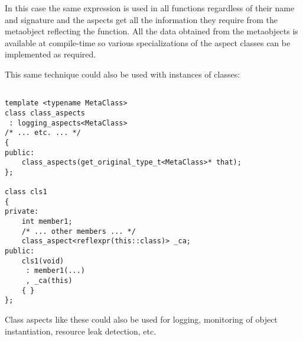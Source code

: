 In this case the same expression is used in all functions
regardless of their name and signature and the aspects get all the information
they require from the metaobject reflecting the function. All the data
obtained from the metaobjects is available at compile-time so various
specializations of the aspect classes can be implemented as required.

This same technique could also be used with instances of classes:

\begin{verbatim}

template <typename MetaClass>
class class_aspects
 : logging_aspects<MetaClass>
/* ... etc. ... */
{
public:
	class_aspects(get_original_type_t<MetaClass>* that);
};

class cls1
{
private:
	int member1;
	/* ... other members ... */
	class_aspect<reflexpr(this::class)> _ca;
public:
	cls1(void)
	 : member1(...)
	 , _ca(this)
	{ }
};

\end{verbatim}

Class aspects like these could also be used for logging, monitoring of object
instantiation, resource leak detection, etc.

